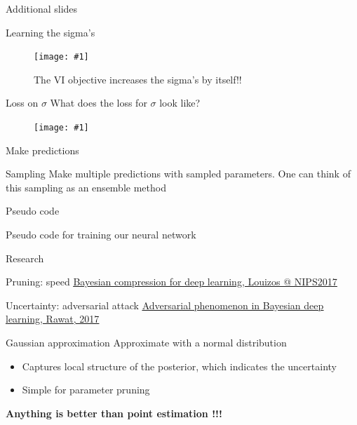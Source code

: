 \documentclass{beamer}
\newcommand{\fitfigure}[1]{\centering\texttt{[image: \#1]}}
\newcommand{\mdlink}[2]{\href{#2}{\underline{#1}}}
\begin{document}
\begin{frame}
	\centerline{\Huge{Additional slides}}
\end{frame}

\begin{frame}{Learning the sigma's}
	\begin{figure}
		\fitfigure{/home/rob/Dropbox/ml_projects/weight_uncertainty/weight_uncertainty/im/tensorboard_sample_sigma_pruning.png}
		\caption{The VI objective increases the sigma's by itself!!}
	\end{figure}
	
\end{frame}

\begin{frame}{Loss on $\sigma$}
	What does the loss for $\sigma$ look like?
	\begin{figure}
		\fitfigure{/home/rob/Dropbox/ml_projects/weight_uncertainty/weight_uncertainty/im/loss_sigma.png}
	\end{figure}
\end{frame}

\begin{frame}{Make predictions}
	\begin{block}{Sampling}
		Make multiple predictions with sampled parameters. 
		One can think of this sampling as an ensemble method
	\end{block}   
	
\end{frame}


\begin{frame}[shrink=30]{Pseudo code}
	\centerline{Pseudo code for training our neural network}
	
\end{frame}

\begin{frame}[shrink=10]
	
\end{frame}

\begin{frame}{Research}
	\begin{block}{Pruning: speed}
		\mdlink{Bayesian compression for deep learning, Louizos @ NIPS2017}{http://papers.nips.cc/paper/6921-bayesian-compression-for-deep-learning.pdf}
	\end{block}
	
	\begin{block}{Uncertainty: adversarial attack}
		\mdlink{Adversarial phenomenon in Bayesian deep learning, Rawat, 2017}{https://arxiv.org/pdf/1711.08244.pdf}
	\end{block}
\end{frame}

\begin{frame}{Gaussian approximation}
	Approximate with a normal distribution
	\begin{itemize}
		\item Captures local structure of the posterior, which indicates the uncertainty
		\item Simple for parameter pruning
	\end{itemize}
	\centerline{  }
	\textbf{\Huge{Anything is better than point estimation !!!}}
\end{frame}
\end{document}
